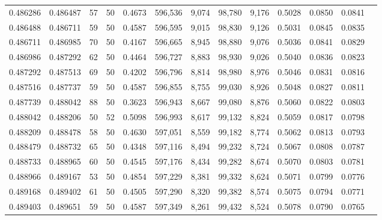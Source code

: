 \begin{tabular}{rrrrrrrrrrrrr}
0.486286 & 0.486487 &    57 &  50 &                                     0.4673 & 596,536 &   9,074 &  98,780 &   9,176 & 0.5028 & 0.0850 & 0.0841 \\
0.486488 & 0.486711 &    59 &  50 &                                     0.4587 & 596,595 &   9,015 &  98,830 &   9,126 & 0.5031 & 0.0845 & 0.0835 \\
0.486711 & 0.486985 &    70 &  50 &                                     0.4167 & 596,665 &   8,945 &  98,880 &   9,076 & 0.5036 & 0.0841 & 0.0829 \\
0.486986 & 0.487292 &    62 &  50 &                                     0.4464 & 596,727 &   8,883 &  98,930 &   9,026 & 0.5040 & 0.0836 & 0.0823 \\
0.487292 & 0.487513 &    69 &  50 &                                     0.4202 & 596,796 &   8,814 &  98,980 &   8,976 & 0.5046 & 0.0831 & 0.0816 \\
0.487516 & 0.487737 &    59 &  50 &                                     0.4587 & 596,855 &   8,755 &  99,030 &   8,926 & 0.5048 & 0.0827 & 0.0811 \\
0.487739 & 0.488042 &    88 &  50 &                                     0.3623 & 596,943 &   8,667 &  99,080 &   8,876 & 0.5060 & 0.0822 & 0.0803 \\
0.488042 & 0.488206 &    50 &  52 &                                     0.5098 & 596,993 &   8,617 &  99,132 &   8,824 & 0.5059 & 0.0817 & 0.0798 \\
0.488209 & 0.488478 &    58 &  50 &                                     0.4630 & 597,051 &   8,559 &  99,182 &   8,774 & 0.5062 & 0.0813 & 0.0793 \\
0.488479 & 0.488732 &    65 &  50 &                                     0.4348 & 597,116 &   8,494 &  99,232 &   8,724 & 0.5067 & 0.0808 & 0.0787 \\
0.488733 & 0.488965 &    60 &  50 &                                     0.4545 & 597,176 &   8,434 &  99,282 &   8,674 & 0.5070 & 0.0803 & 0.0781 \\
0.488966 & 0.489167 &    53 &  50 &                                     0.4854 & 597,229 &   8,381 &  99,332 &   8,624 & 0.5071 & 0.0799 & 0.0776 \\
0.489168 & 0.489402 &    61 &  50 &                                     0.4505 & 597,290 &   8,320 &  99,382 &   8,574 & 0.5075 & 0.0794 & 0.0771 \\
0.489403 & 0.489651 &    59 &  50 &                                     0.4587 & 597,349 &   8,261 &  99,432 &   8,524 & 0.5078 & 0.0790 & 0.0765 \\

\end{tabular}
